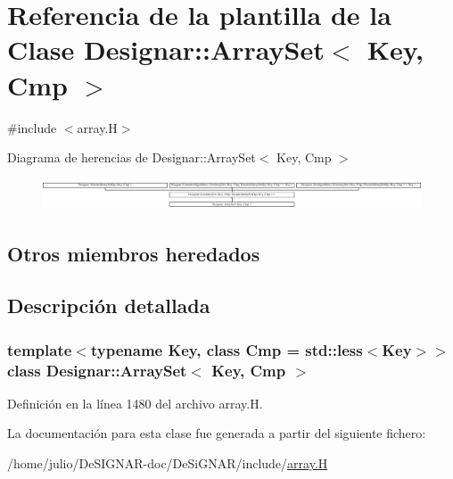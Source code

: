 \hypertarget{class_designar_1_1_array_set}{}\section{Referencia de la plantilla de la Clase Designar\+:\+:Array\+Set$<$ Key, Cmp $>$}
\label{class_designar_1_1_array_set}


{\ttfamily \#include $<$array.\+H$>$}

Diagrama de herencias de Designar\+:\+:Array\+Set$<$ Key, Cmp $>$\begin{figure}[H]
\begin{center}
\leavevmode
\includegraphics[height=0.922570cm]{class_designar_1_1_array_set}
\end{center}
\end{figure}
\subsection*{Otros miembros heredados}


\subsection{Descripción detallada}
\subsubsection*{template$<$typename Key, class Cmp = std\+::less$<$\+Key$>$$>$\newline
class Designar\+::\+Array\+Set$<$ Key, Cmp $>$}



Definición en la línea 1480 del archivo array.\+H.



La documentación para esta clase fue generada a partir del siguiente fichero\+:\begin{DoxyCompactItemize}
\item 
/home/julio/\+De\+S\+I\+G\+N\+A\+R-\/doc/\+De\+Si\+G\+N\+A\+R/include/\hyperlink{array_8_h}{array.\+H}\end{DoxyCompactItemize}
